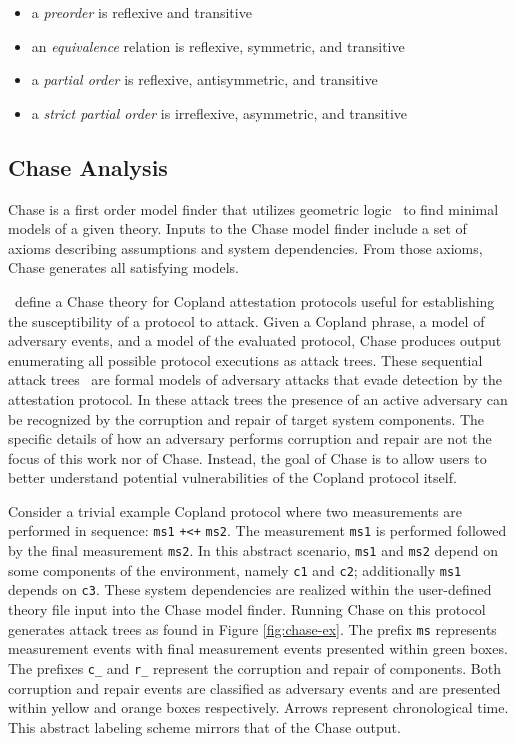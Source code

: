 \documentclass[runningheads]{llncs}
\theoremstyle{definition}
\newcommand{\squash}{\itemsep=0pt\parskip=0pt}
\begin{document}
\begin{itemize}
  \squash
\item a \emph{preorder} is reflexive and transitive
\item an \emph{equivalence} relation is reflexive, symmetric, and transitive 
\item a \emph{partial order} is reflexive, antisymmetric, and transitive 
\item a \emph{strict partial order} is irreflexive, asymmetric, and transitive 
\end{itemize}

\subsection*{Chase Analysis}

Chase \citep{Ramsdell:2020:Chase,Rowe:2021:AutomatedTrust} is a first
order model finder that utilizes geometric
logic~\citep{Enderton:logic} to find minimal models of a given
theory. Inputs to the Chase model finder include a set of axioms
describing assumptions and system dependencies. From those axioms,
Chase generates all satisfying models.


\citet{Rowe:2021:AutomatedTrust}~define a Chase theory for Copland
attestation protocols useful for establishing the susceptibility of a
protocol to attack. Given a Copland phrase, a model of adversary
events, and a model of the evaluated protocol, Chase produces output
enumerating all possible protocol executions as attack trees. These
sequential attack trees~\citep{Horne:Attack, Jhaware:attack} are
formal models of adversary attacks that evade detection by the
attestation protocol.  In these attack trees the presence of an active
adversary can be recognized by the corruption and repair of target
system components. The specific details of how an adversary performs
corruption and repair are not the focus of this work nor of
Chase. Instead, the goal of Chase is to allow users to better
understand potential vulnerabilities of the Copland
protocol itself.

Consider a trivial example Copland protocol where two measurements are
performed in sequence: \texttt{ms1} \texttt{+<+} \texttt{ms2}.
The measurement \texttt{ms1} is performed followed by the
final measurement \texttt{ms2}. In this abstract scenario, \texttt{ms1} and
\texttt{ms2} depend on some components of the environment, namely
\texttt{c1} and \texttt{c2}; additionally \texttt{ms1} depends on
\texttt{c3}. These system dependencies are realized within the
user-defined theory file input into the Chase model finder. Running
Chase on this protocol generates attack trees as found in Figure
\ref{fig:chase-ex}. The prefix \texttt{ms}
represents measurement events with final measurement events presented
within green boxes. The prefixes \texttt{c\_} and  \texttt{r\_} 
represent the corruption and repair of components. Both
corruption and repair events are classified as adversary events and
are presented within yellow and orange boxes respectively. Arrows 
represent chronological time. This abstract labeling scheme mirrors that of the Chase output.
\end{document}
